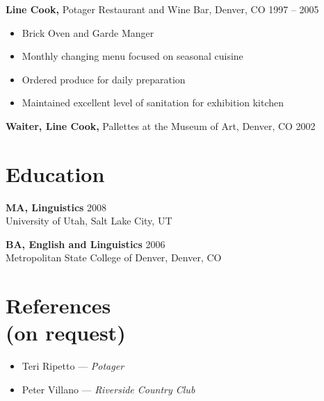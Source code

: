 \documentclass[margin]{resume}
\begin{document}
\begin{resume}
{\bf Line Cook,} Potager Restaurant and Wine Bar, Denver, CO \hfill 1997 -- 2005
 \begin{itemize} \itemsep -2pt  %
 \item Brick Oven and Garde Manger 
 \item Monthly changing menu focused on seasonal cuisine
 \item Ordered produce for daily preparation 
 \item Maintained excellent level of sanitation for exhibition kitchen
 \end{itemize}


{\bf Waiter, Line Cook,} Pallettes at the Museum of Art, Denver, CO \hfill 2002                
 
\section{Education}
{\bf MA, Linguistics} \hfill 2008 \\ 
University of Utah, Salt Lake City, UT

{\bf BA, English and Linguistics} \hfill 2006 \\
Metropolitan State College of Denver, Denver, CO 
 
\section{References\\ (on request)}
\begin{itemize}
\item[] Teri Ripetto --- \textsl{Potager}
\item[] Peter Villano --- \textsl{Riverside Country Club}
\end{itemize}

                
 


\end{resume} 
\end{document}

